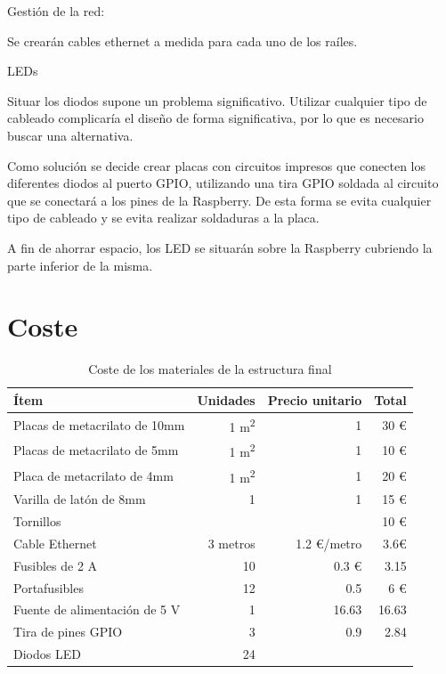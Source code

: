 Gestión de la red:

Se crearán cables ethernet a medida para cada uno de los raíles.

LEDs

Situar los diodos supone un problema significativo. Utilizar cualquier tipo de cableado complicaría el diseño de forma significativa, por lo que es necesario buscar una alternativa.

Como solución se decide crear placas con circuitos impresos que conecten los diferentes diodos al puerto GPIO, utilizando una tira GPIO soldada al circuito que se conectará a los pines de la Raspberry. De esta forma se evita cualquier tipo de cableado y se evita realizar soldaduras a la placa.

A fin de ahorrar espacio, los LED se situarán sobre la Raspberry cubriendo la parte inferior de la misma.

\section{Coste}

\begin{table}[H]
\centering
\begin{tabular}{|l|r|r|r|}
\hline
\textbf{Ítem} & \textbf{Unidades} & \textbf{Precio unitario} & \textbf{Total} \\ \hline
Placas de metacrilato de 10mm & 1 m\textsuperscript{2} & 1 & 30 € \\ \hline
Placas de metacrilato de 5mm & 1 m\textsuperscript{2} & 1 & 10 € \\ \hline
Placa de metacrilato de 4mm & 1 m\textsuperscript{2} & 1 & 20 € \\ \hline
Varilla de latón de 8mm & 1 & 1& 15 €\\ \hline
Tornillos & & & 10 €\\ \hline
Cable Ethernet & 3 metros & 1.2 €/metro & 3.6€\\ \hline
Fusibles de 2 A & 10 & 0.3 € & 3.15\\ \hline
Portafusibles & 12 & 0.5 & 6 € \\ \hline
Fuente de alimentación de 5 V & 1 & 16.63 & 16.63 \\ \hline
Tira de pines GPIO & 3 & 0.9 & 2.84 \\ \hline
Diodos LED & 24 & &\\ \hline
\end{tabular}
\caption{Coste de los materiales de la estructura final}
\end{table}


